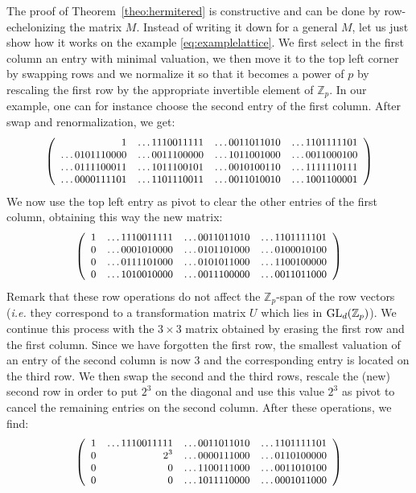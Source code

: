 \documentclass[11pt]{article}
\numberwithin{equation}{section}
\numberwithin{figure}{section}
\theoremstyle{definition}
\newcommand{\Z}{\mathbb Z}
\newcommand{\Zp}{\Z_p}
\newcommand{\GL}{\text{\rm GL}}
\begin{document}
The proof of Theorem~\ref{theo:hermitered} is constructive and can be 
done by row-echelonizing the matrix $M$. Instead of writing it down for 
a general $M$, let us just show how it works on the example 
\eqref{eq:examplelattice}. We first select in the first column an entry 
with minimal valuation, we then move it to the top left corner by swapping rows 
and we normalize it so that it becomes a power of $p$ by rescaling the 
first row by the appropriate invertible element of $\Zp$.
In our example, one can for instance choose the second entry of the 
first column. After swap and renormalization, we get:
$$\small \left(\begin{array}{rrrr}
               1 & \ldots1110011111 & \ldots0011011010 & \ldots1101111101 \\
\ldots0101110000 & \ldots0011100000 & \ldots1011001000 & \ldots0011000100 \\
\ldots0111100011 & \ldots1011100101 & \ldots0010100110 & \ldots1111110111 \\
\ldots0000111101 & \ldots1101110011 & \ldots0011010010 & \ldots1001100001
\end{array}\right)$$
We now use the top left entry as pivot to clear the other entries of
the first column, obtaining this way the new matrix:
$$\small \left(\begin{array}{rrrr}
1 & \ldots1110011111 & \ldots0011011010 & \ldots1101111101 \\
0 & \ldots0001010000 & \ldots0101101000 & \ldots0100010100 \\
0 & \ldots0111101000 & \ldots0101011000 & \ldots1100100000 \\
0 & \ldots1010010000 & \ldots0011100000 & \ldots0011011000
\end{array}\right)$$
Remark that these row operations do not affect the $\Zp$-span
of the row vectors (\emph{i.e.} they correspond to a transformation
matrix $U$ which lies in $\GL_d(\Zp)$).
We continue this process with the $3 \times 3$ matrix obtained by erasing the first row
and the first column. Since we have forgotten the first row, the smallest
valuation of an entry of the second column is now $3$ and the corresponding
entry is located on the third row. We then swap the second and the third
rows, rescale the (new) second row in order to put $2^3$ on the diagonal
and use this value $2^3$ as pivot to cancel the remaining entries on the
second column. After these operations, we find:
$$\small \left(\begin{array}{rrrr}
1 & \ldots1110011111 & \ldots0011011010 & \ldots1101111101 \\
0 & 2^3 & \ldots0000111000 & \ldots0110100000 \\
0 &   0 & \ldots1100111000 & \ldots0011010100 \\
0 &   0 & \ldots1011110000 & \ldots0001011000
\end{array}\right)$$
\end{document}
